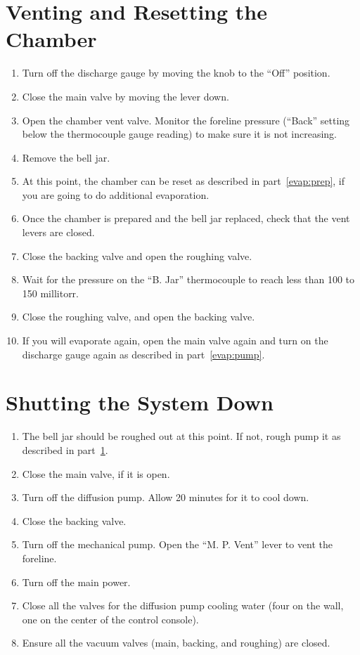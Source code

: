 \documentclass{thesis-umich}
\begin{document}
\section{Venting and Resetting the Chamber}
\label{evap:reset}
\begin{enumerate}
	\item Turn off the discharge gauge by moving the knob to the ``Off'' position.
	\item Close the main valve by moving the lever down.
	\item Open the chamber vent valve. Monitor the foreline pressure (``Back'' setting below the thermocouple gauge reading) to make sure it is not increasing.
	\item Remove the bell jar.
	\item At this point, the chamber can be reset as described in part~\ref{evap:prep}, if you are going to do additional evaporation.
	\item Once the chamber is prepared and the bell jar replaced, check that the vent levers are closed.
	\item Close the backing valve and open the roughing valve.
	\item Wait for the pressure on the ``B. Jar'' thermocouple to reach less than 100 to 150 millitorr.
	\item Close the roughing valve, and open the backing valve.
	\item If you will evaporate again, open the main valve again and turn on the discharge gauge again as described in part~\ref{evap:pump}.
\end{enumerate}

\section{Shutting the System Down}
\begin{enumerate}
	\item The bell jar should be roughed out at this point. If not, rough pump it as described in part~\ref{evap:reset}.
	\item Close the main valve, if it is open.
	\item Turn off the diffusion pump. Allow 20 minutes for it to cool down.
	\item Close the backing valve.
	\item Turn off the mechanical pump. Open the ``M. P. Vent'' lever to vent the foreline.
	\item Turn off the main power.
	\item Close all the valves for the diffusion pump cooling water (four on the wall, one on the center of the control console).
	\item Ensure all the vacuum valves (main, backing, and roughing) are closed.
\end{enumerate}
\end{document}

